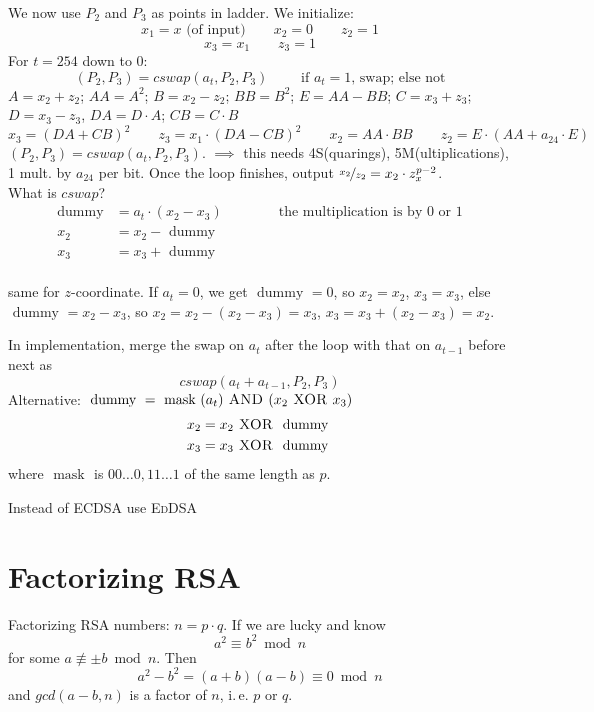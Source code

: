 We now use $P_2$ and $P_3$ as points in ladder. We initialize:
\[
x_1 = x \text{ (of input)} \qquad x_2 = 0 \qquad z_2 = 1
\]
\[
x_3 = x_1 \qquad  z_3 = 1
\]
For $t = 254$ down to $0$:
\[
(P_2,P_3) = cswap (a_t,P_2,P_3) \qquad \text{ if $a_t =1$, swap; else not}
\]
$A=x_2 + z_2$; $AA = A^2$; $B=x_2-z_2$; $BB = B^2$; $E=AA-BB$; $C=x_3 + z_3$; $D=x_3-z_3$, $DA = D \cdot A$; $CB = C \cdot B$ 
\[
x_3 = (DA + CB)^2 \qquad z_3 = x_1 \cdot (DA - CB)^2 \qquad x_2 = AA \cdot BB \qquad z_2 = E \cdot (AA + a_{24} \cdot E)
\]
$(P_2,P_3) = cswap (a_t,P_2,P_3)$. $\implies$ this needs 4S(quarings), 5M(ultiplications), 1 mult. by $a_{24}$ per bit. Once the loop finishes, output $\nicefrac{x_2}{z_2} = x_2 \cdot z_x^{p-2}$.\\

What is $cswap$? 
\begin{align*}
\text{dummy} &= a_t \cdot (x_2-x_3) \qquad \qquad \text{the multiplication is by 0 or 1} \\
x_2 &= x_2 - \text{ dummy}\\
x_3 &= x_3 + \text{ dummy}\\
\end{align*}

same for $z$-coordinate. If $a_t = 0$, we get $\text{ dummy } = 0$, so $x_2 =x_2$, $x_3=x_3$, else $\text{ dummy } = x_2 - x_3$, so $x_2 = x_2 - (x_2-x_3) = x_3$, $x_3 = x_3 + (x_2 - x_3) = x_2$.

In implementation, merge the swap on $a_t$ after the loop with that on $a_{t-1}$ before next as 
\[
cswap (a_t + a_{t-1}, P_2, P_3)
\]
Alternative: $\text{ dummy } = \text{ mask } (a_t) \textsc{ AND } (x_2 \textsc{ XOR } x_3)$
\begin{align*}
x_2 &= x_2 \textsc{ XOR } \text{ dummy } \\
x_3 &= x_3 \textsc{ XOR } \text{ dummy }
\end{align*}
where $\text{ mask }$ is $00 \dots 0, 11\dots 1$ of the same length as $p$.

Instead of \textsc{ECDSA} use \textsc{EdDSA}

\section{Factorizing RSA}

Factorizing \textsc{RSA} numbers: $n= p \cdot q$. If we are lucky and know
\[
a^2 \equiv b^2 \bmod n
\]
for some $a \not\equiv \pm b \bmod n$. Then
\[
a^2 - b^2 = (a+b)(a-b) \equiv 0 \bmod n
\]
and $gcd(a-b,n)$ is a factor of $n$, i.\,e. $p$ or $q$.

